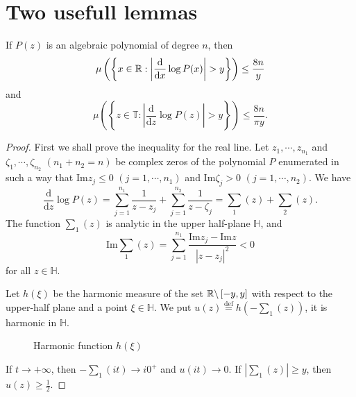 \section{Two usefull lemmas}
\begin{lemma}\label{lemma-1}
  If $P(z)$ is an algebraic polynomial of degree $n$, then 
  \[
    \mu \left( \left\{ x\in \mathbb{R}:\left| \frac{\mathrm{d}}{\mathrm{d}x}\log P(x) \right| >y \right\}  \right) \le \frac{8n}{y}
  \] and
  \[
    \mu \left( \left\{ z\in \mathbb{T}:\left| \frac{\mathrm{d}}{\mathrm{d}z}\log P(z) \right| >y \right\}  \right) \le \frac{8n}{\pi y}.
  \] 
\end{lemma}

\begin{proof}
  First we shall prove the inequality for the real line. Let $z_1,\cdots,z_{n_1}$ and $\zeta_1,\cdots,\zeta_{n_2}$ $\left( n_1+n_2=n \right) $ be complex zeros of the polynomial $P$ enumerated in such a way that $\mathrm{Im}z_j\le 0$ $\left( j=1,\cdots, n_1 \right) $ and $\mathrm{Im}\zeta_j>0$ $\left( j=1,\cdots,n_2 \right) $. We have 
  \[
    \frac{\mathrm{d}}{\mathrm{d}z}\log P(z)= \sum_{j=1}^{n_1} \frac{1}{z-z_j}+\sum_{j=1}^{n_2} \frac{1}{z-\zeta_j}=\sum_1(z)+\sum_2(z).
  \] 
  The function $\sum_1(z)$ is analytic in the upper half-plane $\mathbb{H}$, and 
   \[
     \mathrm{Im}\sum_1(z)=\sum_{j=1}^{n_1} \frac{\mathrm{Im}z_j-\mathrm{Im}z}{\left| z-z_j \right| ^2}<0
  \] 
  for all $z\in \mathbb{H}$.

  Let $h(\xi)$ be the harmonic measure of the set $\mathbb{R} \backslash \left[ -y,y \right] $ with respect to the upper-half plane and a point $\xi \in \mathbb{H}$. We put $u(z) \overset{\mathrm{def}}{=}h\left( -\sum_{1}^{} (z) \right) $, it is harmonic in $\mathbb{H}$.

\begin{figure}[ht]
    \centering
    \caption{Harmonic function $h(\xi)$}
    \label{fig:harmonic-function-2}
\end{figure}
If $t\to +\infty$, then $-\sum_{1}^{} (it)\to i0^{+} $ and $u(it)\to 0$. If  $\left| \sum_{1}(z) \right| \ge y$, then $u(z)\ge \frac{1}{2}$.


\end{proof}
